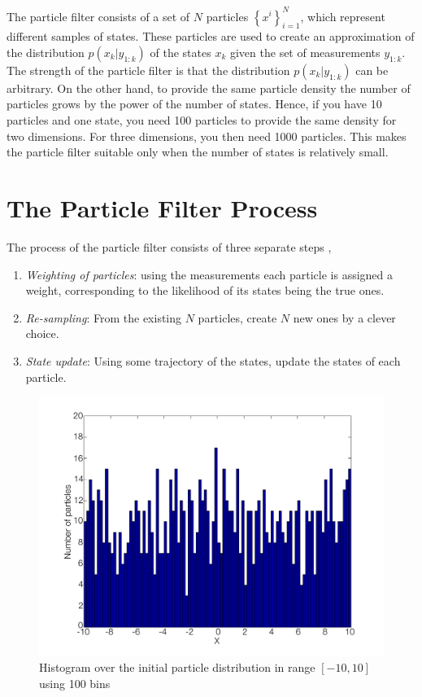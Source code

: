 \documentclass{LTHthesis}
\begin{document}
The particle filter consists of a set of $N$ particles $\left\{x^i\right\}_{i=1}^N$, which represent different samples of states. These particles are used to create an approximation of the distribution $p(x_k|y_{1:k})$  of the states $x_k$ given the set of measurements $y_{1:k}$. The strength of the particle filter is that the distribution $p(x_k|y_{1:k})$ can be arbitrary. On the other hand, to provide the same particle density the number of particles grows by the power of the number of states. Hence, if you have 10 particles and one state, you need 100 particles to provide the same density for two dimensions. For three dimensions, you then need 1000 particles. This makes the particle filter suitable only when the number of states is relatively small.
%
\section{The Particle Filter Process}
\label{sec:PF_process}
%
The process of the particle filter consists of three separate steps \cite{gson12}, 
\begin{enumerate}
\item \emph{Weighting of particles}: using the measurements each particle is assigned a weight, corresponding to the likelihood of its states being the true ones.
\item \emph{Re-sampling}: From the existing $N$ particles, create $N$ new ones by a clever choice.
\item \emph{State update}: Using some trajectory of the states, update the states of each particle.
\end{enumerate}
%
\begin{figure}[!hbt]

\includegraphics[width=1\textwidth ]{images/PF/hist_ini_dist}
\caption{Histogram over the initial particle distribution in range $[-10,10]$ using 100 bins}\label{hist_ini_dist}
\end{figure}
\end{document}
